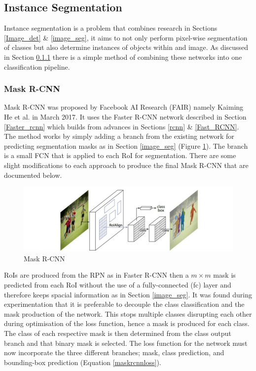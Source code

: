 \documentclass[11pt,twoside]{report}
\begin{document}
\subsection{Instance Segmentation}
Instance segmentation is a problem that combines research in Sections \ref{Image_det} \& \ref{image_seg}, it aims to not only perform pixel-wise segmentation of classes but also determine instances of objects within and image. As discussed in Section \ref{mask_rcnn} there is a simple method of combining these networks into one classification pipeline.
\subsubsection{Mask R-CNN} \label{mask_rcnn}
Mask R-CNN was proposed by Facebook AI Research (FAIR) namely Kaiming He et al. in March 2017. It uses the Faster R-CNN network described in Section \ref{Faster_rcnn} which builds from advances in Sections \ref{rcnn}  \& \ref{Fast_RCNN}. The method works by simply adding a branch from the existing network for predicting segmentation masks as in Section \ref{image_seg} (Figure \ref{Mask_rcnn_arch}). The branch is a small FCN that is applied to each RoI for segmentation. There are some slight modifications to each approach to produce the final Mask R-CNN that are documented below.

\noindent \begin{figure}[H]
	\includegraphics[width = 1.0\hsize]{./figures/mask_arch.jpg}
	\caption{Mask R-CNN \cite{DBLP:journals/corr/HeGDG17}}
	\label{Mask_rcnn_arch}
\end{figure}
RoIs are produced from the RPN as in Faster R-CNN \cite{DBLP:journals/corr/RenHG015} then a $m \times m$ mask is predicted from each RoI without the use of a fully-connected (fc) layer and therefore keeps spacial information as in Section \ref{image_seg}. It was found during experimentation that it is preferable to decouple the class classification and the mask production of the network. This stops multiple classes disrupting each other during optimisation of the loss function, hence a mask is produced for each class. The class of each respective mask is then determined from the class output branch and that binary mask is selected. 
\newline \newline
The loss function for the network must now incorporate the three different branches; mask, class prediction, and bounding-box prediction (Equation \ref{maskrcnnloss}). 
\end{document}
